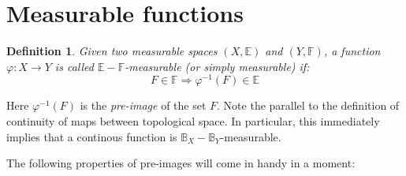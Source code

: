 \documentclass[12pt, a4paper]{article}
\newtheorem{definition}{Definition}[section]
\numberwithin{equation}{section}
\begin{document}
\section{Measurable functions}

\begin{definition}
Given two measurable spaces $(X,\mathbb{E})$ and $(Y,\mathbb{F})$, a function $\varphi: X\rightarrow Y$ is called $\mathbb{E}-\mathbb{F}$-measurable (or simply measurable) if:
\begin{equation}
\label{measurable_function}
F\in\mathbb{F}\Rightarrow \varphi^{-1}(F)\in\mathbb{E}
\end{equation}
\end{definition}
Here $\varphi^{-1}(F)$ is the \textit{pre-image} of the set $F$. Note the parallel to the definition of continuity of maps between topological space. In particular, this immediately implies that a continous function is $\mathbb{B}_X-\mathbb{B}_Y$-measurable.

The following properties of pre-images will come in handy in a moment:
\end{document}
